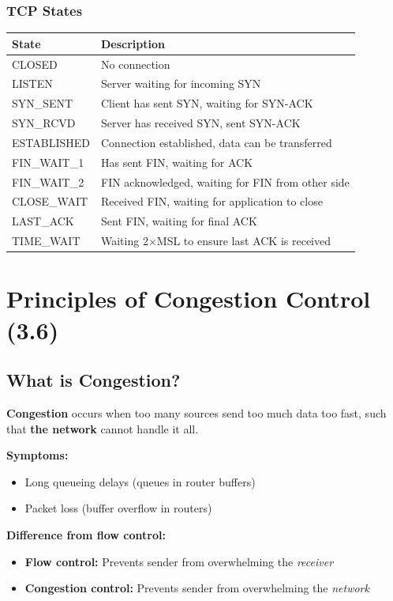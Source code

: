 \subsubsection{TCP States}

\begin{center}
\begin{tabular}{ll}
\toprule
\textbf{State} & \textbf{Description} \\
\midrule
CLOSED & No connection \\
LISTEN & Server waiting for incoming SYN \\
SYN\_SENT & Client has sent SYN, waiting for SYN-ACK \\
SYN\_RCVD & Server has received SYN, sent SYN-ACK \\
ESTABLISHED & Connection established, data can be transferred \\
FIN\_WAIT\_1 & Has sent FIN, waiting for ACK \\
FIN\_WAIT\_2 & FIN acknowledged, waiting for FIN from other side \\
CLOSE\_WAIT & Received FIN, waiting for application to close \\
LAST\_ACK & Sent FIN, waiting for final ACK \\
TIME\_WAIT & Waiting 2$\times$MSL to ensure last ACK is received \\
\bottomrule
\end{tabular}
\end{center}

\section{Principles of Congestion Control (3.6)}

\subsection{What is Congestion?}

\begin{keybox}[Congestion]
\textbf{Congestion} occurs when too many sources send too much data too fast, such that \textbf{the network} cannot handle it all.

\textbf{Symptoms:}
\begin{itemize}[noitemsep]
    \item Long queueing delays (queues in router buffers)
    \item Packet loss (buffer overflow in routers)
\end{itemize}

\textbf{Difference from flow control:}
\begin{itemize}[noitemsep]
    \item \textbf{Flow control:} Prevents sender from overwhelming the \emph{receiver}
    \item \textbf{Congestion control:} Prevents sender from overwhelming the \emph{network}
\end{itemize}
\end{keybox}

